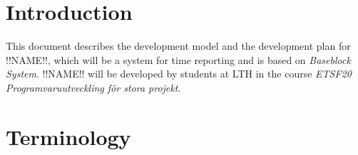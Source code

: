 \documentclass{article}
\date {#1}
\title {
    \documentNumber {01}    %
    \documentVersion {0.1}
    \documentTitle {Software development plan - SDP}
    \documentGroup {2}
    \documentResponsible {(PG) Projet-management Group}
    \documentAuthors {(PG) Projet-management Group}
    \documentDate {\today}
}
\begin{document}
\maketitle
\thispagestyle{empty}

\newpage

\tableofcontents

\newpage

\section{Introduction}
    This document describes the development model and the development plan for !!NAME!!, 
    which will be a system for time reporting and is based on \textit{Baseblock System}.
    !!NAME!! will be developed by students at LTH in the course 
    \textit{ETSF20 Programvaruutveckling för stora projekt}.

\section{Terminology}
    \renewcommand{\arraystretch}{1.7}  %
    
\end{document}
